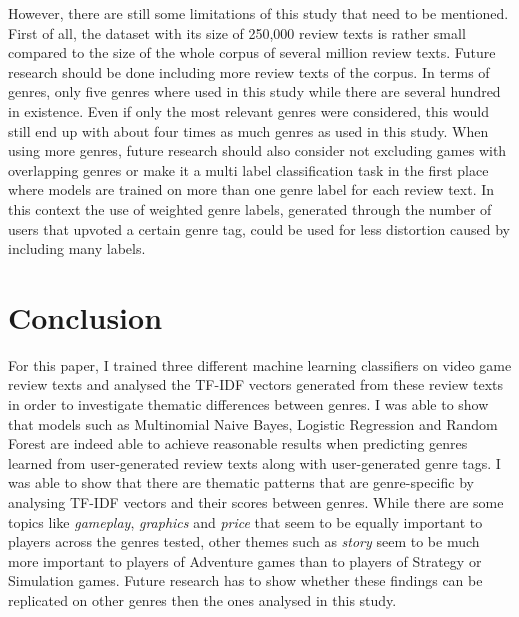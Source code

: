 \documentclass[11pt, a4paper]{article}
\begin{document}
However, there are still some limitations of this study that need to be mentioned.
First of all, the dataset with its size of 250,000 review texts is rather small compared to the size of the whole corpus
of several million review texts.
Future research should be done including more review texts of the corpus.
In terms of genres, only five genres where used in this study while there are several hundred in existence.
Even if only the most relevant genres were considered, this would still end up with about four times as much genres as
used in this study.
When using more genres, future research should also consider not excluding games with overlapping genres or make
it a multi label classification task in the first place where models are trained on more than one genre label for each
review text.
In this context the use of weighted genre labels, generated through the number of users that upvoted a certain genre tag,
could be used for less distortion caused by including many labels.


\section{Conclusion}\label{sec:conclusion}
For this paper, I trained three different machine learning classifiers on video game review texts and
analysed the TF-IDF vectors generated from these review texts in order to investigate thematic differences between
genres.
I was able to show that models such as Multinomial Naive Bayes, Logistic Regression and Random Forest are indeed able to
achieve reasonable results when predicting genres learned from user-generated review texts along with user-generated
genre tags.
I was able to show that there are thematic patterns that are genre-specific by analysing TF-IDF vectors
and their scores between genres.
While there are some topics like \textit{gameplay}, \textit{graphics} and \textit{price} that seem to be equally important
to players across the genres tested, other themes such as \textit{story} seem to be much more important to players of
Adventure games than to players of Strategy or Simulation games.
Future research has to show whether these findings can be replicated on other genres then the ones analysed in this
study.


\clearpage

\printbibliography

\clearpage
\end{document}

